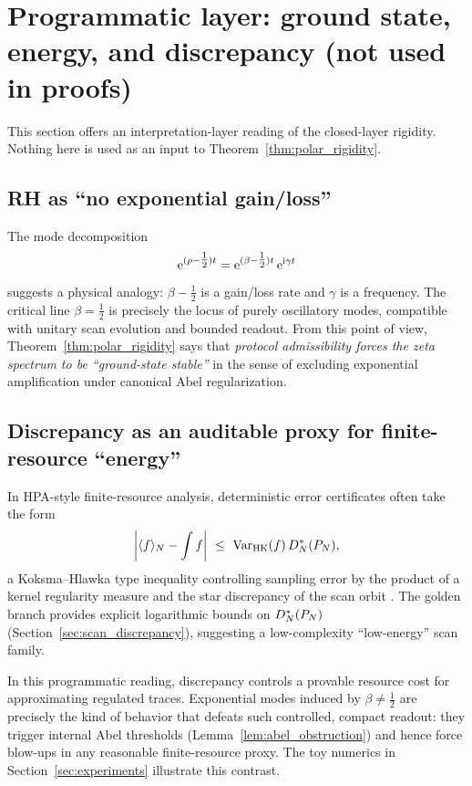 
\section{Programmatic layer: ground state, energy, and discrepancy (not used in proofs)}
\label{sec:programmatic}

This section offers an interpretation-layer reading of the closed-layer rigidity.
Nothing here is used as an input to Theorem~\ref{thm:polar_rigidity}.

\subsection{RH as ``no exponential gain/loss''}
\label{sec:programmatic_no_gain}

The mode decomposition
\[
\mathrm{e}^{(\rho-\tfrac{1}{2})t}=\mathrm{e}^{(\beta-\tfrac{1}{2})t}\,\mathrm{e}^{\mathrm{i}\gamma t}
\]
suggests a physical analogy: $\beta-\tfrac{1}{2}$ is a gain/loss rate and $\gamma$ is a frequency.
The critical line $\beta=\tfrac{1}{2}$ is precisely the locus of purely oscillatory modes, compatible with unitary scan evolution and bounded readout.
From this point of view, Theorem~\ref{thm:polar_rigidity} says that \emph{protocol admissibility forces the zeta spectrum to be ``ground-state stable''} in the sense of excluding exponential amplification under canonical Abel regularization.

\subsection{Discrepancy as an auditable proxy for finite-resource ``energy''}
\label{sec:programmatic_discrepancy_energy}

In HPA-style finite-resource analysis, deterministic error certificates often take the form
\[
\left|\avgN{f}-\int f\right|\ \le\ \HKVar(f)\,\DNstar(P_N),
\]
a Koksma--Hlawka type inequality controlling sampling error by the product of a kernel regularity measure and the star discrepancy of the scan orbit \cite{KuipersNiederreiter1974, DrmotaTichy1997}.
The golden branch provides explicit logarithmic bounds on $D_N^\ast(P_N)$ (Section~\ref{sec:scan_discrepancy}), suggesting a low-complexity ``low-energy'' scan family.

In this programmatic reading, discrepancy controls a provable resource cost for approximating regulated traces.
Exponential modes induced by $\beta\neq\tfrac{1}{2}$ are precisely the kind of behavior that defeats such controlled, compact readout: they trigger internal Abel thresholds (Lemma~\ref{lem:abel_obstruction}) and hence force blow-ups in any reasonable finite-resource proxy.
The toy numerics in Section~\ref{sec:experiments} illustrate this contrast.


